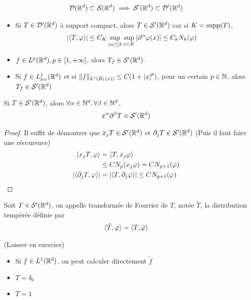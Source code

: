 \documentclass[]{report}
\begin{document}
    \[\mathcal{D}(\mathbb{R}^d)\subset \mathcal{S}(\mathbb{R}^d)\implies \mathcal{S}'(\mathbb{R}^d)\subset \mathcal{D}'(\mathbb{R}^d)\]

    \begin{ex}{}{}
        \begin{itemize}
            \item Si $T\in \mathcal{D}'(\mathbb{R}^d)$ à support compact, alors $T\in \mathcal{S}'(\mathbb{R}^d)$ car si $K=\text{supp}(T)$,
            \[\left|\langle T,\varphi \rangle\right|\le C_K\sup_{|\alpha|\le k}\sup_{x\in K}|\partial^\alpha \varphi(x)|\le C_k N_k(\varphi)\]
            \item $f\in L^p(\mathbb{R}^d),p\in [1,+\infty]$, alors $T_f\in \mathcal{S}'(\mathbb{R}^d)$.
            \item Si $f\in L^1_{\text{loc}}(\mathbb{R}^d)$ et si $\lVert f \rVert_{L^1(B_1(x))}\le C(1+\left|x\right|^p)$, pour un certain $p\in \mathbb{N}$, alors $T_f\in \mathcal{S}'(\mathbb{R}^d)$
        \end{itemize}
    \end{ex}

    \begin{prop}{}{}
        Si $T\in \mathcal{S}'(\mathbb{R}^d)$, alors $\forall \alpha\in \mathbb{N}^d,\forall \beta\in \mathbb{N}^d$,
        \[x^\alpha\partial^\beta T\in \mathcal{S}'(\mathbb{R}^d)\]
    \end{prop}

    \begin{proof}
        Il suffit de démontrer que $x_j T\in \mathcal{S}'(\mathbb{R}^d)$ et $\partial_j T\in \mathcal{S}'(\mathbb{R}^d)$ (Puis il faut faire une réccurence)
        \begin{align*}
            \langle x_j T,\varphi \rangle&=\langle T,x_j\varphi \rangle\\
            &\le C N_p(x_j\varphi)=C N_{p+1}(\varphi)\\
            \left|\langle \partial_j T,\varphi \rangle\right|&=\left|\langle T,\partial_j \varphi \rangle\right|\le C N_{p+1}(\varphi)
        \end{align*}
    \end{proof}

    \begin{df}{}{}
        Soit $T\in \mathcal{S}'(\mathbb{R}^d)$, on appelle transformée de Fourrier de $T$, notée $\tilde{T}$, la distribution tempérée définie par
        \[\langle \tilde{T},\varphi \rangle=\langle T,\tilde{\varphi} \rangle\]
    \end{df}

    \begin{ex}{}{}
        (Laisser en exercice)
        \begin{itemize}
            \item Si $f\in L^1(\mathbb{R}^d)$, on peut calculer directement $\tilde f$
            \item $T=\delta_0$
            \item $T=1$
        \end{itemize}
    \end{ex}
\end{document}
